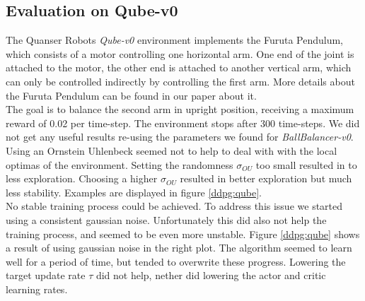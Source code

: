 \subsection{Evaluation on Qube-v0}
The Quanser Robots \textit{Qube-v0} environment implements the Furuta Pendulum, which consists of a motor controlling one horizontal arm. One end of the joint is attached to the motor, the other end is attached to another vertical arm, which can only be controlled indirectly by controlling the first arm. More details about the Furuta Pendulum can be found in our paper about it.\\
The goal is to balance the second arm in upright position, receiving a maximum reward of 0.02 per time-step. The environment stops after 300 time-steps.
We did not get any useful results re-using the parameters we found for \textit{BallBalancer-v0}. Using an Ornstein Uhlenbeck seemed not to help to deal with with the local optimas of the environment. Setting the randomness $\sigma_{OU}$ too small resulted in to less exploration. Choosing a higher $\sigma_{OU}$ resulted in better exploration but much less stability. Examples are displayed in figure \ref{ddpg:qube}.\\
No stable training process could be achieved. To address this issue we started using a consistent gaussian noise. Unfortunately this did also not help the training process, and seemed to be even more unstable. Figure \ref{ddpg:qube} shows a result of using gaussian noise in the right plot. The algorithm seemed to learn well for a period of time, but tended to overwrite these progress. Lowering the target update rate $\tau$ did not help, nether did lowering the actor and critic learning rates.
